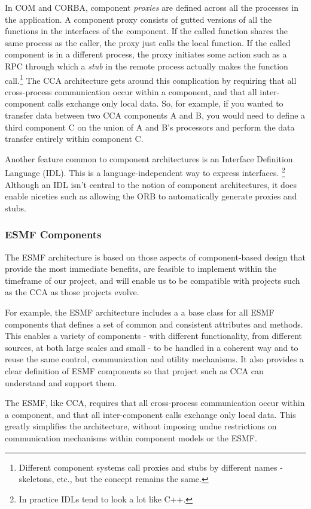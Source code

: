 In COM and CORBA, component {\it proxies} are defined across
all the processes in the application.  A component proxy consists of gutted 
versions of all the functions in the interfaces of the component.  If the 
called function shares the same process as the caller, the proxy just 
calls the local function.  If the called component is in a different process, 
the proxy initiates some action such as a RPC through which a {\it stub} in 
the remote process actually makes the function call.\footnote{Different 
component systems call proxies and 
stubs by different names - skeletons, etc., but the concept remains the same.}  
The CCA architecture gets around this complication by 
requiring that all cross-process communication occur within a component, and
that all inter-component calls exchange only local data.  So, for example,
if you wanted to transfer data between two CCA components A and B, you would need 
to define a third component C on the union of A and B's processors and perform
the data transfer entirely within component C.

Another feature common to component architectures is an Interface Definition 
Language (IDL).  This is a language-independent way to express 
interfaces.  \footnote{In practice IDLs tend to look a lot like C++.}  Although 
an IDL isn't central to the notion of component architectures, it does enable 
niceties such as allowing the ORB to automatically generate proxies and stubs.

\subsubsection{ESMF Components}

The ESMF architecture is based on those aspects of component-based design that
provide the most immediate benefits, are feasible to implement within the
timeframe of our project, and will enable us to be compatible with projects 
such as the CCA as those projects evolve.  

For example, the ESMF architecture includes a a base class for
all ESMF components that defines a set of common and consistent attributes
and methods.  This enables a variety of components - with different functionality, from different sources, at both large scales and small - to be handled
in a coherent way and to reuse the same control, communication and utility
mechanisms.  It also provides a clear definition of ESMF components so that
project such as CCA can understand and support them.  

The ESMF, like CCA, requires that all cross-process communication occur
within a component, and that all inter-component calls exchange only
local data.  This greatly simplifies the architecture, without 
imposing undue restrictions on communication mechanisms within component
models or the ESMF.


